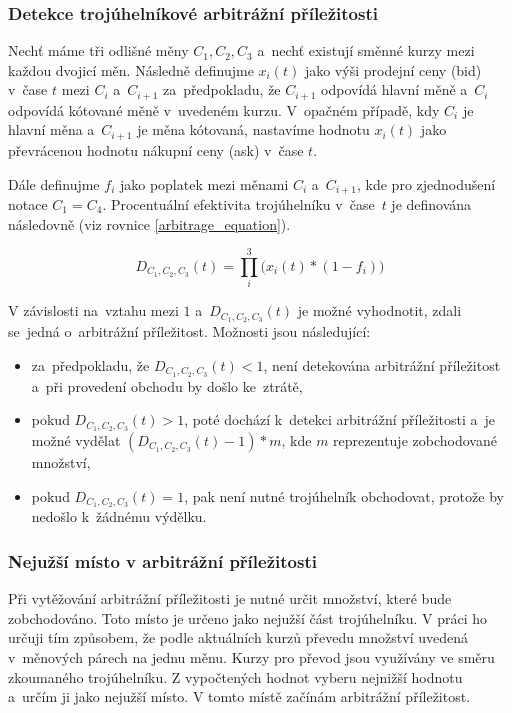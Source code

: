 \documentclass[thesis=B,czech]{FITthesis}[2019/03/21]
\begin{document}
\subsubsection{Detekce trojúhelníkové arbitrážní příležitosti}
Nechť máme tři odlišné měny \(C_1,C_2,C_3\) a~nechť existují směnné kurzy mezi každou dvojicí měn. Následně definujme \(x_i(t)\) jako výši prodejní ceny (bid) v~čase \(t\) mezi \(C_i\) a~\(C_{i+1}\) za~předpokladu, že \(C_{i+1}\) odpovídá hlavní měně a~\(C_{i}\) odpovídá kótované měně v~uvedeném kurzu. V~opačném případě, kdy \(C_{i}\) je hlavní měna a~\(C_{i+1}\) je měna kótovaná, nastavíme hodnotu \(x_i(t)\) jako převrácenou hodnotu nákupní ceny (ask) v~čase \(t\).

Dále definujme \(f_i\) jako poplatek mezi měnami \(C_i\) a~\(C_{i+1}\), kde pro zjednodušení notace \(C_1 = C_4\). Procentuální efektivita trojúhelníku v~čase~\(t\) je definována následovně (viz rovnice \ref{arbitrage_equation}).

\begin{equation}
\label{arbitrage_equation}
    D_{C_1,C_2,C_3}(t) = \prod_i^3\Big(x_i(t)*(1-f_i)\Big)
\end{equation}

V závislosti na~vztahu mezi \(1\) a~\(D_{C_1,C_2,C_3}(t)\) je možné vyhodnotit, zdali se~jedná o~arbitrážní příležitost. Možnosti jsou následující:
\begin{itemize}
    \item za~předpokladu, že \(D_{C_1,C_2,C_3}(t) < 1\), není detekována arbitrážní  \linebreak příležitost a~při provedení obchodu by došlo ke~ztrátě,
    \item pokud \(D_{C_1,C_2,C_3}(t) > 1\), poté dochází k~detekci arbitrážní příležitosti a~je možné vydělat \( (D_{C_1,C_2,C_3}(t) - 1) * m\), kde \(m\) reprezentuje zobchodované množství,
    \item pokud \(D_{C_1,C_2,C_3}(t) = 1\), pak není nutné trojúhelník obchodovat, protože by nedošlo k~žádnému výdělku.
\end{itemize}

\subsubsection{Nejužší místo v arbitrážní příležitosti}
Při vytěžování arbitrážní příležitosti je nutné určit množství, které bude zobchodováno. Toto místo je určeno jako nejužší část trojúhelníku. V práci ho určuji tím způsobem, že podle aktuálních kurzů převedu množství uvedená v~měnových párech na jednu měnu. Kurzy pro převod jsou využívány ve směru zkoumaného trojúhelníku. Z vypočtených hodnot vyberu nejnižší hodnotu a~určím ji jako nejužší místo. V tomto místě začínám arbitrážní příležitost. 
\end{document}
